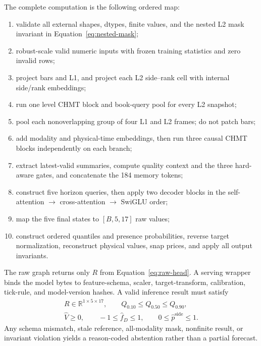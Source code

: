 \documentclass[10pt,letterpaper]{article}
\numberwithin{equation}{section}
\newcommand{\R}{\mathbb{R}}
\theoremstyle{definition}
\theoremstyle{remark}
\begin{document}
The complete computation is the following ordered map:
\begin{enumerate}
  \item validate all external shapes, dtypes, finite values, and the nested L2
  mask invariant in Equation~\eqref{eq:nested-mask};
  \item robust-scale valid numeric inputs with frozen training statistics and
  zero invalid rows;
  \item project bars and L1, and project each L2 side--rank cell with internal
  side/rank embeddings;
  \item run one level CHMT block and book-query pool for every L2 snapshot;
  \item pool each nonoverlapping group of four L1 and L2 frames; do not patch
  bars;
  \item add modality and physical-time embeddings, then run three causal CHMT
  blocks independently on each branch;
  \item extract latest-valid summaries, compute quality context and the three
  hard-aware gates, and concatenate the 184 memory tokens;
  \item construct five horizon queries, then apply two decoder blocks in the
  self-attention $\rightarrow$ cross-attention $\rightarrow$ SwiGLU order;
  \item map the five final states to $[B,5,17]$ raw values;
  \item construct ordered quantiles and presence probabilities, reverse target
  normalization, reconstruct physical values, snap prices, and apply all output
  invariants.
\end{enumerate}

The raw graph returns only $R$ from Equation~\eqref{eq:raw-head}. A serving
wrapper binds the model bytes to feature-schema, scaler, target-transform,
calibration, tick-rule, and model-version hashes. A valid inference result must
satisfy
\begin{equation}
\begin{gathered}
R\in\R^{1\times5\times17},\qquad
Q_{0.10}\le Q_{0.50}\le Q_{0.90},\\
\widehat V\ge0,\qquad -1\le\widehat f_D\le1,\qquad
0\le\widehat p^{\mathrm{side}}\le1.
\end{gathered}
\label{eq:output-invariants}
\end{equation}
Any schema mismatch, stale reference, all-modality mask, nonfinite result, or
invariant violation yields a reason-coded abstention rather than a partial
forecast.
\end{document}
